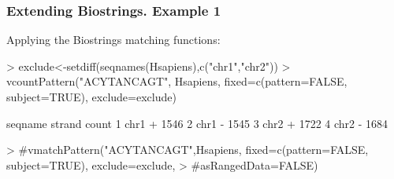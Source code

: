 \documentclass{beamer}
\begin{document}

\begin{frame}[fragile]
\frametitle{Extending Biostrings. Example 1}
  \bit
      \item Applying the Biostrings matching functions:
         \begin{uncoverenv}
\begin{Schunk}
\begin{Sinput}
> exclude<-setdiff(seqnames(Hsapiens),c("chr1","chr2"))
> vcountPattern("ACYTANCAGT", Hsapiens, fixed=c(pattern=FALSE, subject=TRUE), exclude=exclude)
\end{Sinput}
\begin{Soutput}
  seqname strand count
1    chr1      +  1546
2    chr1      -  1545
3    chr2      +  1722
4    chr2      -  1684
\end{Soutput}
\begin{Sinput}
> #vmatchPattern("ACYTANCAGT",Hsapiens, fixed=c(pattern=FALSE, subject=TRUE), exclude=exclude, 
> #asRangedData=FALSE)
\end{Sinput}
\end{Schunk}
        \end{uncoverenv}   
  \eit
\end{frame}

\end{document}
